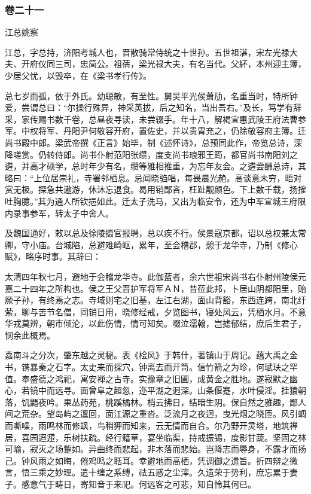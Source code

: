 \documentclass[]{article}
\begin{document}
\hypertarget{header-n4809}{%
\subsubsection{卷二十一}\label{header-n4809}}

江总姚察

江总，字总持，济阳考城人也，晋散骑常侍统之十世孙。五世祖湛，宋左光禄大夫、开府仪同三司，忠简公。祖蒨，梁光禄大夫，有名当代。父紑，本州迎主簿，少居父忧，以毁卒，在《梁书孝行传》。

总七岁而孤，依于外氏。幼聪敏，有至性。舅吴平光侯萧劢，名重当时，特所钟爱，尝谓总曰：``尔操行殊异，神采英拔，后之知名，当出吾右。''及长，笃学有辞采，家传赐书数千卷，总昼夜寻读，未尝辍手。年十八，解褐宣惠武陵王府法曹参军。中权将军、丹阳尹何敬容开府，置佐史，并以贵胄充之，仍除敬容府主簿。迁尚书殿中郎。梁武帝撰《正言》始毕，制《述怀诗》，总预同此作，帝览总诗，深降嗟赏。仍转侍郎。尚书仆射范阳张缵，度支尚书琅邪王筠，都官尚书南阳刘之遴，并高才硕学，总时年少有名，缵等雅相推重，为忘年友会。之遴尝酬总诗，其略曰：``上位居崇礼，寺署邻栖息。忌闻晓驺唱，每畏晨光赩。高谈意未穷，晤对赏无极。探急共遨游，休沐忘退食。曷用销鄙吝，枉趾觏颜色。下上数千载，扬搉吐胸臆。''其为通人所钦挹如此。迁太子洗马，又出为临安令，还为中军宣城王府限内录事参军，转太子中舍人。

及魏国通好，敕以总及徐陵摄官报聘，总以疾不行。侯景寇京都，诏以总权兼太常卿，守小庙。台城陷，总避难崎岖，累年，至会稽郡，憩于龙华寺，乃制《修心赋》，略序时事。其辞曰：

太清四年秋七月，避地于会稽龙华寺。此伽蓝者，余六世祖宋尚书右仆射州陵侯元嘉二十四年之所构也。侯之王父晋护军将军ＡＮ，昔莅此邦，卜居山阴都阳里，贻厥子孙，有终焉之志。寺域则宅之旧基，左江右湖，面山背豁，东西连跨，南北纡萦，聊与苦节名僧，同销日用，晓修经戒，夕览图书，寝处风云，凭栖水月。不意华戎莫辨，朝市倾沦，以此伤情，情可知矣。啜泣濡翰，岂摅郁结，庶后生君子，悯余此概焉。

嘉南斗之分次，肇东越之灵秘。表《桧风》于韩什，著镇山于周记。蕴大禹之金书，镌暴秦之石字。太史来而探穴，钟离去而开笥。信竹箭之为珍，何珷玞之罕值。奉盛德之鸿祀，寓安禅之古寺。实豫章之旧圃，成黄金之胜地。遂寂默之幽心，若镜中而远寻。面曾阜之超忽，迩平湖之迥深。山条偃蹇，水叶侵淫。挂猿朝落，饥鼯夜吟。果丛药苑，桃蹊橘林。梢云拂日，结暗生阴。保自然之雅趣，鄙人间之荒杂。望岛屿之邅回，面江源之重沓。泛流月之夜迥，曳光烟之晓匝。风引蜩而嘶噪，雨鸣林而修飒，鸟稍狎而知来，云无情而自合。尔乃野开灵塔，地筑禅居，喜园迢遰，乐树扶疏。经行籍草，宴坐临渠，持戒振锡，度影甘蔬。坚固之林可喻，寂灭之场蹔如。异曲终而悲起，非木落而悲始。岂降志而辱身，不露才而扬己。钟风雨之如晦，倦鸡鸣之聒耳。幸避地而高栖，凭调御之遗旨。折四辩之微言，悟三乘之妙理。遣十缠之系缚，祛五惑之尘滓。久遗荣于势利，庶忘累于妻子。感意气于畴日，寄知音于来祀。何远客之可悲，知自怜其何已。
\end{document}
